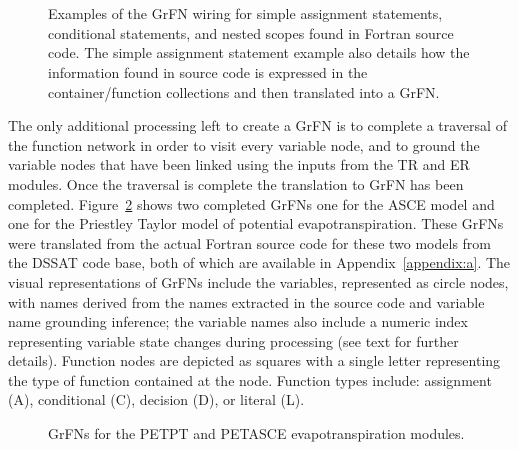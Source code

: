 \FloatBarrier
\begin{figure}[!htbp]
  \centering
  \\
  \\
  \caption[Source Code to GrFN Wiring Examples]{Examples of the GrFN wiring for simple assignment statements, conditional statements, and nested scopes found in Fortran source code. The simple assignment statement example also details how the information found in source code is expressed in the container/function collections and then translated into a GrFN.}
  \label{fig:statement_wiring}
\end{figure}
\FloatBarrier

The only additional processing left to create a GrFN is to complete a traversal of the function network in order to visit every variable node, and to ground the variable nodes that have been linked using the inputs from the TR and ER modules.
Once the traversal is complete the translation to GrFN has been completed.
Figure~\ref{fig:grfn_cgs} shows two completed GrFNs one for the ASCE model and one for the Priestley Taylor model of potential evapotranspiration.
These GrFNs were translated from the actual Fortran source code for these two models from the DSSAT code base, both of which are available in Appendix~\ref{appendix:a}.
The visual representations of GrFNs include the variables, represented as circle nodes, with names derived from the names extracted in the source code and variable name grounding inference; the variable names also include a numeric index representing variable state changes during processing (see text for further details).
Function nodes are depicted as squares with a single letter representing the type of function contained at the node.
Function types include: assignment (A), conditional (C), decision (D), or literal (L).

\FloatBarrier
\begin{figure}[!htbp]
  \centering
  \hfill
  \caption[Evapo-transpiration GrFN Examples]{GrFNs for the PETPT and PETASCE evapotranspiration modules.}
  \label{fig:grfn_cgs}
\end{figure}
\FloatBarrier


